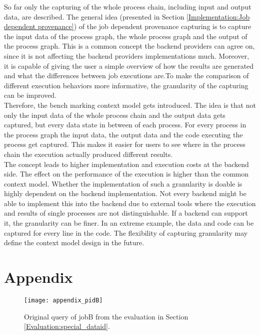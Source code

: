 \documentclass[draft,final]{vutinfth} %
\begin{document}
So far only the capturing of the whole process chain, including input and output data, are described. The general idea (presented in Section \ref{Implementation:Job dependent provenance}) of the job dependent provenance capturing is to capture the input data of the process graph, the whole process graph and the output of the process graph. This is a common concept the backend providers can agree on, since it is not affecting the backend providers implementations much. Moreover, it is capable of giving the user a simple overview of how the results are generated and what the differences between job executions are.To make the comparison of different execution behaviors more informative, the granularity of the capturing can be improved. \\
Therefore, the bench marking context model gets introduced. The idea is that not only the input data of the whole process chain and the output data gets captured, but every data state in between of each process. For every process in the process graph the input data, the output data and the code executing the process get captured. This makes it easier for users to see where in the process chain the execution actually produced different results.\\ The concept leads to higher implementation and execution costs at the backend side. The effect on the performance of the execution is higher than the common context model. Whether the implementation of such a granularity is  doable is highly dependent on the backend implementation. Not every backend might be able to implement this into the backend due to external tools where the execution and results of single processes are not distinguishable. If a backend can support it, the granularity can be finer. In an extreme example, the data and code can be captured for every line in the code. The flexibility of capturing granularity may define the context model design in the future.  

\chapter{Appendix}\label{Appendix}

\begin{figure}[h]
	\centering
	\texttt{[image: appendix\_pidB]}
	\caption{Original query of jobB from the evaluation in Section \ref{Evaluation:special_dataid}.}
	\label{fig:appendix_pidB} %
\end{figure}
\end{document}
